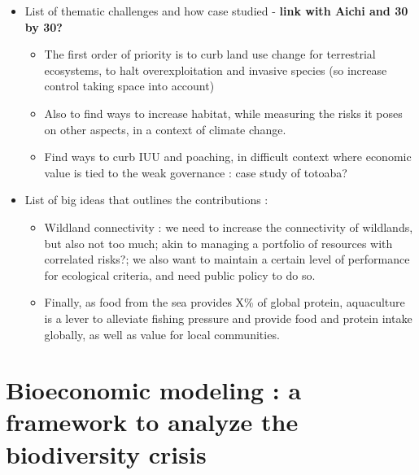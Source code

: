 \begin{itemize}
\item List of thematic challenges and how case studied - \textbf{link with Aichi and 30 by 30?}
\begin{itemize}
\item The first order of priority is to curb land use change for terrestrial ecosystems, to halt overexploitation and invasive species (so increase control taking space into account)
\item Also to find ways to increase habitat, while measuring the risks it poses on other aspects, in a context of climate change. 
\item Find ways to curb IUU and poaching, in difficult context where economic value is tied to the weak governance : case study of totoaba? 
\end{itemize}
\item List of big ideas that outlines the contributions : 
\begin{itemize}
\item Wildland connectivity : we need to increase the connectivity of wildlands, but also not too much; akin to managing a portfolio of resources with correlated risks?; we also want to maintain a certain level of performance for ecological criteria, and need public policy to do so.
\item Finally, as food from the sea provides X\% of global protein, aquaculture is a lever to alleviate fishing pressure and provide food and protein intake globally, as well as value for local communities. 
\end{itemize}
\end{itemize}

\section*{Bioeconomic modeling : a framework to analyze the biodiversity crisis}

